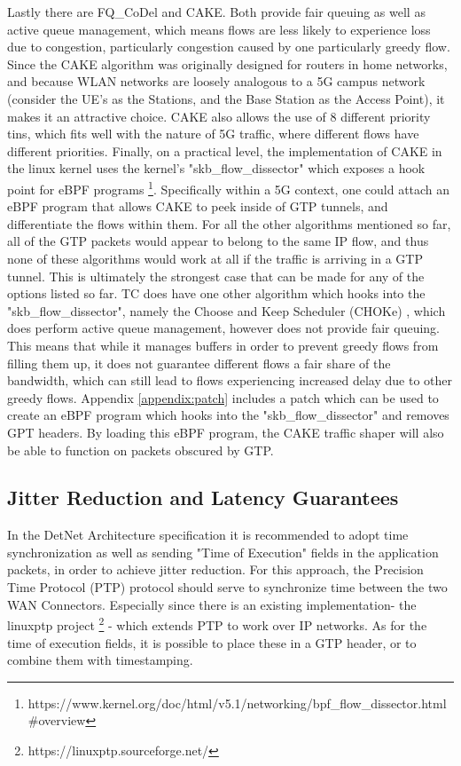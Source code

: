 Lastly there are FQ\_CoDel and CAKE. Both provide fair queuing as well as active queue management, which means flows are less likely to experience loss due to congestion, particularly congestion caused by one particularly greedy flow. Since the CAKE algorithm was originally designed for routers in home networks, and because WLAN networks are loosely analogous to a 5G campus network (consider the UE's as the Stations, and the Base Station as the Access Point), it makes it an attractive choice. CAKE also allows the use of 8 different priority tins, which fits well with the nature of 5G traffic, where different flows have different priorities. Finally, on a practical level, the implementation of CAKE in the linux kernel uses the kernel's "skb\_flow\_dissector" which exposes a hook point for eBPF programs \footnote{https://www.kernel.org/doc/html/v5.1/networking/bpf\_flow\_dissector.html\#overview}. Specifically within a 5G context, one could attach an eBPF program that allows CAKE to peek inside of GTP tunnels, and differentiate the flows within them. For all the other algorithms mentioned so far, all of the GTP packets would appear to belong to the same IP flow, and thus none of these algorithms would work at all if the traffic is arriving in a GTP tunnel. This is ultimately the strongest case that can be made for any of the options listed so far. TC does have one other algorithm which hooks into the "skb\_flow\_dissector", namely the Choose and Keep Scheduler (CHOKe) \cite{pan2000choke}, which does perform active queue management, however does not provide fair queuing. This means that while it manages buffers in order to prevent greedy flows from filling them up, it does not guarantee different flows a fair share of the bandwidth, which can still lead to flows experiencing increased delay due to other greedy flows. Appendix \ref{appendix:patch} includes a patch which can be used to create an eBPF program which hooks into the "skb\_flow\_dissector" and removes GPT headers. By loading this eBPF program, the CAKE traffic shaper will also be able to function on packets obscured by GTP.

\subsection{Jitter Reduction and Latency Guarantees}

In the DetNet Architecture specification it is recommended to adopt time synchronization as well as sending "Time of Execution" fields in the application packets, in order to achieve jitter reduction. For this approach, the Precision Time Protocol (PTP) protocol should serve to synchronize time between the two WAN Connectors. Especially since there is an existing implementation- the linuxptp project \footnote{https://linuxptp.sourceforge.net/} -  which extends PTP to work over IP networks. As for the time of execution fields, it is possible to place these in a GTP header, or to combine them with timestamping.

